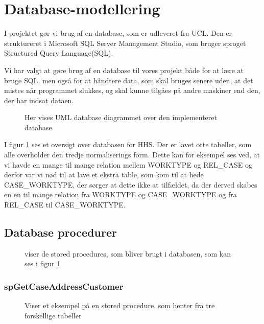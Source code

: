 \section{Database-modellering}\label{databasemodellering}

I projektet gør vi brug af en database, som er udleveret fra UCL. Den er struktureret i Microsoft SQL Server Management Studio, som bruger sproget Structured Query Language(SQL).



Vi har valgt at gøre brug af en database til vores projekt både for at lære at bruge SQL, men også for at håndtere data, som skal bruges senere uden, at det mistes når programmet slukkes, og skal kunne tilgåes på andre maskiner end den, der har indsat dataen.

\begin{figure}[H]
    \caption{Her vises UML database diagrammet over den implementeret database}
    \label{fig:DatabaseDiagram}
\end{figure}

I figur \ref{fig:DatabaseDiagram} ses et oversigt over databasen for HHS.
Der er lavet otte tabeller, som alle overholder den tredje normaliserings form. \cite{Database}
Dette kan for eksempel ses ved, at vi havde en mange til mange relation mellem WORKTYPE og REL\_CASE og derfor var vi nød til at lave et ekstra table, som kom til at hede CASE\_WORKTYPE, der sørger at dette ikke at tilfældet, da der derved skabes en en til mange relation fra WORKTYPE og CASE\_WORKTYPE og fra REL\_CASE til CASE\_WORKTYPE.

\subsection{Database procedurer}

\begin{figure}[h]
    \caption{viser de stored procedures, som bliver brugt i databasen, som kan ses i figur \ref{fig:DatabaseDiagram}}
    \label{fig:SP}
\end{figure}

\subsubsection{spGetCaseAddressCustomer}\label{spaddress}
\begin{figure}[H]
    \caption{Viser et eksempel på en stored procedure, som henter fra tre forskellige tabeller}
    \label{fig:SPADRRESCUSTOMER}
\end{figure}

